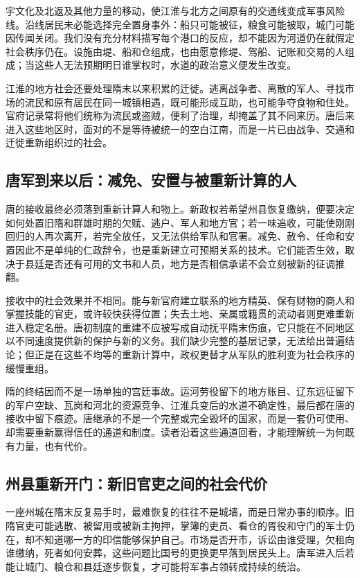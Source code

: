 宇文化及北返及其他力量的移动，使江淮与北方之间原有的交通线变成军事风险线。沿线居民未必能选择完全置身事外：船只可能被征，粮食可能被取，城门可能因传闻关闭。我们没有充分材料描写每个港口的反应，却不能因为河道仍在就假定社会秩序仍在。设施由堤、船和仓组成，也由愿意修堤、驾船、记账和交易的人组成；当这些人无法预期明日谁掌权时，水道的政治意义便发生改变。

江淮的地方社会还要处理隋末以来积累的迁徙。逃离战争者、离散的军人、寻找市场的流民和原有居民在同一城镇相遇，既可能形成互助，也可能争夺食物和住处。官府记录常将他们统称为流民或盗贼，便利了治理，却掩盖了其不同来历。唐后来进入这些地区时，面对的不是等待被统一的空白江南，而是一片已由战争、交通和迁徙重新组织过的社会。

\subsection{唐军到来以后：减免、安置与被重新计算的人}
唐的接收最终必须落到重新计算人和物上。新政权若希望州县恢复缴纳，便要决定如何处置旧隋和群雄时期的欠赋、逃户、军人和地方官；若一味追收，可能使刚刚回归的人再次离开，若完全放任，又无法供给军队和官署。减免、赦令、任命和安置因此不是单纯的仁政辞令，也是重新建立可预期关系的技术。它们能否生效，取决于县廷是否还有可用的文书和人员，地方是否相信承诺不会立刻被新的征调推翻。

接收中的社会效果并不相同。能与新官府建立联系的地方精英、保有财物的商人和掌握技能的官吏，或许较快获得位置；失去土地、亲属或籍贯的流动者则更难重新进入稳定名册。唐初制度的重建不应被写成自动抚平隋末伤痕，它只能在不同地区以不同速度提供新的保护与新的义务。我们缺少完整的基层记录，无法给出普遍结论；但正是在这些不均等的重新计算中，政权更替才从军队的胜利变为社会秩序的缓慢重组。

隋的终结因而不是一场单独的宫廷事故。运河劳役留下的地方账目、辽东远征留下的军户空缺、瓦岗和河北的资源竞争、江淮兵变后的水道不确定性，最后都在唐的接收中留下痕迹。唐继承的不是一个完整或完全毁坏的国家，而是一套仍可使用、却需要重新赢得信任的通道和制度。读者沿着这些通道回看，才能理解统一为何既有力量，也有代价。

\subsection{州县重新开门：新旧官吏之间的社会代价}
一座州城在隋末反复易手时，最难恢复的往往不是城墙，而是日常办事的顺序。旧隋官吏可能逃散、被留用或被新主拘押，掌簿的吏员、看仓的胥役和守门的军士仍在，却不知道哪一方的印信能够保护自己。市场是否开市，诉讼由谁受理，欠租向谁缴纳，死者如何安葬，这些问题比国号的更换更早落到居民头上。唐军进入后若能让城门、粮仓和县廷逐步恢复，才可能将军事占领转成持续的统治。

